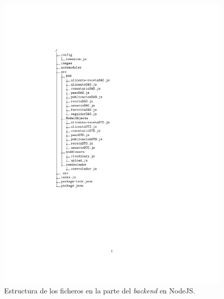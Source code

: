 \begin{figure}
    \centering
    \includegraphics{svg/dirtreeback.pdf}
    \caption{Estructura de los ficheros en la parte del \textit{backend} en NodeJS.}
    \label{fig:dirtreeBack}
\end{figure}

